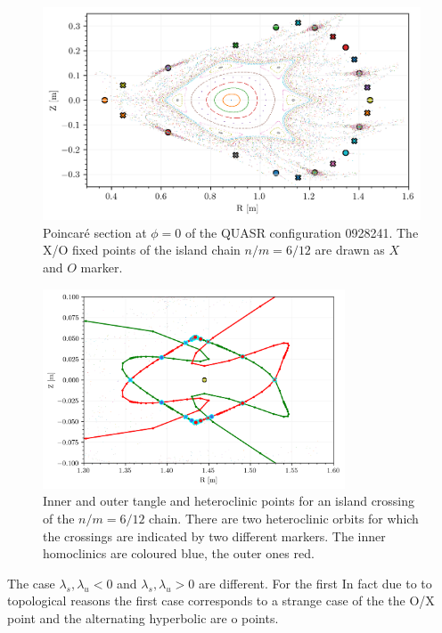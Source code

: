 \begin{figure}[H]
    \centering
    \includegraphics{images/quasrs/fixedpoint_ox_0928241.png}
    \caption{Poincaré section at $\phi=0$ of the QUASR configuration 0928241. The X/O fixed points of the island chain $n/m = 6/12$ are drawn as $X$ and $O$ marker.}
    \label{fig:p-0928241}
\end{figure}


\begin{figure}[H]
    \centering
    \includegraphics[width=0.8\textwidth]{images/quasrs/outer_0928241.png}
    \caption{Inner and outer tangle and heteroclinic points for an island crossing of the $n/m  = 6/12$ chain. There are two heteroclinic orbits for which the crossings are indicated by two different markers. The inner homoclinics are coloured blue, the outer ones red.}
    \label{fig:turn-0928241}
\end{figure}

The case $\lambda_s, \lambda_u < 0$ and $\lambda_s, \lambda_u > 0$ are different. For the first 
In fact due to to topological reasons the first case corresponds to a strange case of the the O/X point and the alternating hyperbolic are o points.

